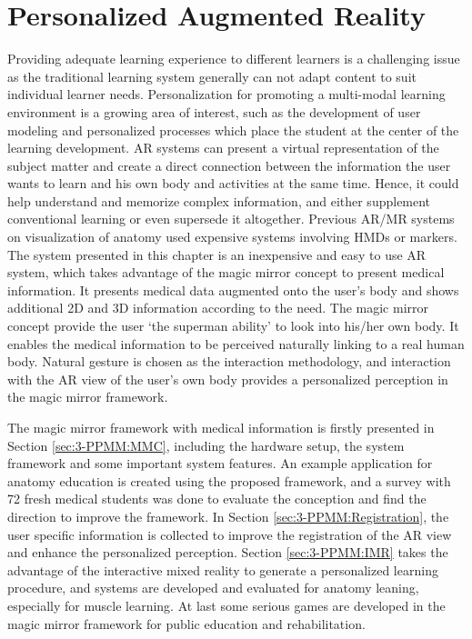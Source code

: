 
\chapter{Personalized Augmented Reality} \label{chaptor:3}
Providing adequate learning experience to different learners is a challenging issue as the traditional learning system generally can not adapt content to suit individual learner needs. Personalization for promoting a multi-modal learning environment is a growing area of interest, such as the development of user modeling and personalized processes which place the student at the center of the learning development.
AR systems can present a virtual representation of the subject matter and create a direct connection between the information the user wants to learn and his own body and activities at the same time. Hence, it could help understand and memorize complex information, and either supplement conventional learning or even supersede it altogether. 
Previous AR/MR systems on visualization of anatomy used expensive systems involving HMDs or markers. The system presented in this chapter is an inexpensive and easy to use AR system, which takes advantage of the magic mirror concept to present medical information. It presents medical data augmented onto the user's body and shows additional 2D and 3D information according to the need. The magic mirror concept provide the user `the superman ability' to look into his/her own body. It enables the medical information to be perceived naturally linking to a real human body. Natural gesture is chosen as the interaction methodology, and interaction with the AR view of the user's own body provides a personalized perception in the magic mirror framework.

The magic mirror framework with medical information is firstly presented in Section \ref{sec:3-PPMM:MMC}, including the hardware setup, the system framework and some important system features. An example application for anatomy education is created using the proposed framework, and a survey with 72 fresh medical students was done to evaluate the conception and find the direction to improve the framework. In Section \ref{sec:3-PPMM:Registration}, the user specific information is collected to improve the registration of the AR view and enhance the personalized perception. Section \ref{sec:3-PPMM:IMR} takes the advantage of the interactive mixed reality to generate a personalized learning procedure, and systems are developed and evaluated for anatomy leaning, especially for muscle learning. At last some serious games are developed in the magic mirror framework for public education and rehabilitation.